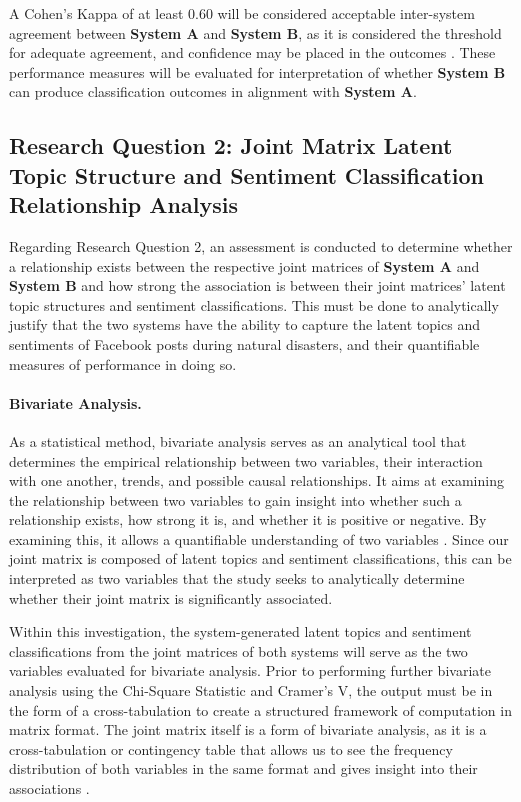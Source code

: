 \documentclass[12pt,a4paper]{report}
\newcommand{\sysA}{\textbf{System A}}
\newcommand{\sysB}{\textbf{System B}}
\begin{document}
A Cohen's Kappa of at least 0.60 will be considered acceptable inter-system
agreement between \sysA{} and \sysB, as it is considered the threshold for
adequate agreement, and confidence may be placed in the outcomes
\parencite{mchugh2012}. These performance measures will be evaluated for
interpretation of whether \sysB{} can produce classification outcomes in
alignment with \sysA.

\subsection{Research Question 2: Joint Matrix Latent Topic Structure and
Sentiment Classification Relationship Analysis}

Regarding Research Question 2, an assessment is conducted to determine whether a
relationship exists between the respective joint matrices of \sysA{} and \sysB{}
and how strong the association is between their joint matrices' latent topic
structures and sentiment classifications. This must be done to analytically
justify that the two systems have the ability to capture the latent topics and
sentiments of Facebook posts during natural disasters, and their quantifiable
measures of performance in doing so.

\paragraph{Bivariate Analysis.} As a statistical method, bivariate analysis
serves as an analytical tool that determines the empirical relationship between
two variables, their interaction with one another, trends, and possible causal
relationships. It aims at examining the relationship between two variables to
gain insight into whether such a relationship exists, how strong it is, and
whether it is positive or negative. By examining this, it allows a
quantifiable understanding of two variables \parencite{bennd}. Since our joint
matrix is composed of latent topics and sentiment classifications, this can be
interpreted as two variables that the study seeks to analytically determine
whether their joint matrix is significantly associated.

Within this investigation, the system-generated latent topics and sentiment
classifications from the joint matrices of both systems will serve as the two
variables evaluated for bivariate analysis. Prior to performing further
bivariate analysis using the Chi-Square Statistic and Cramer's V, the output
must be in the form of a cross-tabulation to create a structured framework of
computation in matrix format. The joint matrix itself is a form of bivariate
analysis, as it is a cross-tabulation or contingency table that allows us to
see the frequency distribution of both variables in the same format and gives
insight into their associations \parencite{bennd}.
\end{document}
